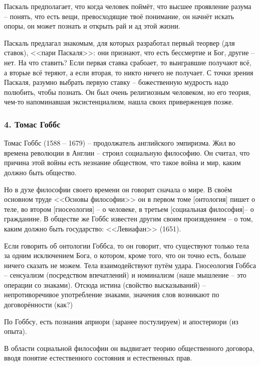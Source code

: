 \documentclass[a4paper, 12pt]{book} %
\begin{document}
Паскаль предполагает, что когда человек поймёт, что высшее проявление разума -- понять, что есть вещи, превосходящие твоё понимание, он начнёт искать опоры, он может познать и открыть рай и ад этой жизни.

Паскаль предлагал знакомым, для которых разработал первый теорвер (для ставок), <<пари Паскаля>>: они признают, что есть бессмертие и Бог, другие -- нет. На что ставить? Если первая ставка срабоает, то выигравшие получают всё, а вторые всё теряют, а если вторая, то никто ничего не получает. С точки зрения Паскаля, разумно выбрать первую ставку -- божественную мудрость надо полюбить, чтобы познать. Он был очень религиозным человеком, но его теория, чем-то напоминавшая эксистенциализм, нашла своих приверженцев позже.

\subsubsection*{4. Томас Гоббс}
Томас Гоббс (1588 -- 1679) -- продолжатель английского эмпиризма. Жил во времена революции в Англии -- строил социальную философию. Он считал, что причина этой войны есть незнание обществом, что такое война и мир, каким должно быть общество.

Но в духе философии своего времени он говорит сначала о мире. В своём основном труде <<Основы философии>> он в первом томе [онтология] пишет о теле, во втором [гносеология] -- о человеке, в третьем [социальная философия]-- о гражданине. В обществе же Гоббс известен другим своим произвдением -- о том, каким должно быть государство: <<Левиафан>> (1651).

Если говорить об онтологии Гоббса, то он говорит, что существуют только тела за одним исключением Бога, о котором, кроме того, что он точно есть, больше ничего сказать не можем. Тела взаимодействуют путём удара. Гносеология Гоббса -- сенсуализм (посредством впечатлений) и номинализм (наше мышление -- это операции со знаками). Отсюда истина (свойство высказываний) -- непротиворечивое употребление знаками, значения слов возникают по договорённости (как?)

По Гоббсу, есть познания априори (заранее постулируем) и апостериори (из опыта).

В области социальной философии он выдвигает теорию общественного договора, вводя понятие естественного состояния и естественных прав.




\tableofcontents 
\end{document}

